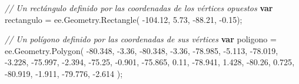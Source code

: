 \documentclass[
  12pt,
  letterpaper,
  twoside]{book}
\newenvironment{Shaded}{\begin{snugshade}}{\end{snugshade}}
\newcommand{\AttributeTok}[1]{\textcolor[rgb]{0.48,0.12,0.64}{#1}}
\newcommand{\CommentTok}[1]{\textcolor[rgb]{0.24,0.58,0.00}{\textit{#1}}}
\newcommand{\FloatTok}[1]{\textcolor[rgb]{0.28,0.53,0.93}{#1}}
\newcommand{\FunctionTok}[1]{\textcolor[rgb]{0.48,0.12,0.64}{#1}}
\newcommand{\KeywordTok}[1]{\textcolor[rgb]{0.00,0.00,0.00}{\textbf{#1}}}
\newcommand{\NormalTok}[1]{#1}
\newcommand{\OperatorTok}[1]{\textcolor[rgb]{0.00,0.00,0.00}{#1}}
\begin{document}
\begin{Shaded}
\begin{Highlighting}[]
\CommentTok{// Un rectángulo definido por las coordenadas de los vértices opuestos}
\KeywordTok{var}\NormalTok{ rectangulo }\OperatorTok{=}\NormalTok{ ee}\OperatorTok{.}\AttributeTok{Geometry}\OperatorTok{.}\FunctionTok{Rectangle}\NormalTok{( }
  \OperatorTok{{-}}\FloatTok{104.12}\OperatorTok{,} \FloatTok{5.73}\OperatorTok{,}
  \OperatorTok{{-}}\FloatTok{88.21}\OperatorTok{,} \OperatorTok{{-}}\FloatTok{0.15}\NormalTok{)}\OperatorTok{;} 

\CommentTok{// Un polígono definido por las coordenadas de sus vértices}
\KeywordTok{var}\NormalTok{ poligono }\OperatorTok{=}\NormalTok{ ee}\OperatorTok{.}\AttributeTok{Geometry}\OperatorTok{.}\FunctionTok{Polygon}\NormalTok{( }
  \OperatorTok{{-}}\FloatTok{80.348}\OperatorTok{,} \OperatorTok{{-}}\FloatTok{3.36}\OperatorTok{,}
  \OperatorTok{{-}}\FloatTok{80.348}\OperatorTok{,} \OperatorTok{{-}}\FloatTok{3.36}\OperatorTok{,}
  \OperatorTok{{-}}\FloatTok{78.985}\OperatorTok{,} \OperatorTok{{-}}\FloatTok{5.113}\OperatorTok{,}
  \OperatorTok{{-}}\FloatTok{78.019}\OperatorTok{,} \OperatorTok{{-}}\FloatTok{3.228}\OperatorTok{,}
  \OperatorTok{{-}}\FloatTok{75.997}\OperatorTok{,} \OperatorTok{{-}}\FloatTok{2.394}\OperatorTok{,}
  \OperatorTok{{-}}\FloatTok{75.25}\OperatorTok{,} \OperatorTok{{-}}\FloatTok{0.901}\OperatorTok{,}
  \OperatorTok{{-}}\FloatTok{75.865}\OperatorTok{,} \FloatTok{0.11}\OperatorTok{,}
  \OperatorTok{{-}}\FloatTok{78.941}\OperatorTok{,} \FloatTok{1.428}\OperatorTok{,}
  \OperatorTok{{-}}\FloatTok{80.26}\OperatorTok{,} \FloatTok{0.725}\OperatorTok{,}
  \OperatorTok{{-}}\FloatTok{80.919}\OperatorTok{,} \OperatorTok{{-}}\FloatTok{1.911}\OperatorTok{,}
  \OperatorTok{{-}}\FloatTok{79.776}\OperatorTok{,} \OperatorTok{{-}}\FloatTok{2.614}
\NormalTok{  )}\OperatorTok{;}


\end{Highlighting}
\end{Shaded}
\end{document}
